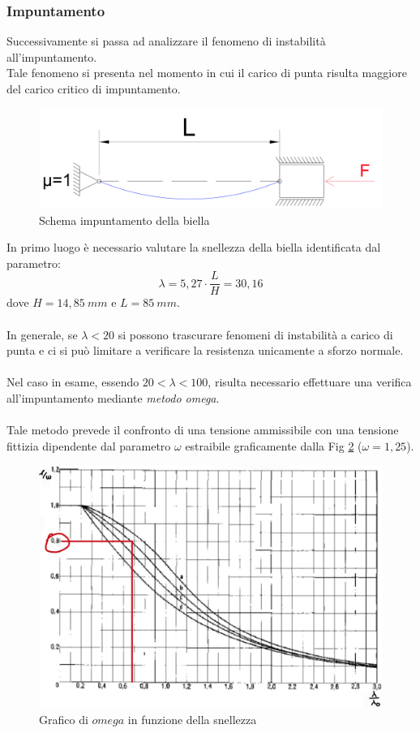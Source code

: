 \subsubsection{Impuntamento}
Successivamente si passa ad analizzare il fenomeno di instabilità all'impuntamento. \\
Tale fenomeno si presenta nel momento in cui il carico di punta risulta maggiore del carico critico di impuntamento.
\begin{figure}[h]
    \centering
    \includegraphics[scale=0.3]{Immagini/CaricoImpuntamento.png}
    \caption{Schema impuntamento della biella}
    \label{fig:CaricoImpuntamento}
\end{figure}

In primo luogo è necessario valutare la snellezza della biella identificata dal parametro:
\begin{equation}
    \lambda=5,27\cdot \frac{L}{H}=30,16
\end{equation}
dove $H=14,85\ mm$ e $L=85\ mm$.\\
\\
In generale, se $\lambda<20$ si possono trascurare fenomeni di instabilità a carico di punta e ci si può limitare a verificare la resistenza unicamente a sforzo normale.\\
\\
Nel caso in esame, essendo $20<\lambda<100$, risulta necessario effettuare una verifica all'impuntamento mediante \emph{metodo omega}.\\
\\
Tale metodo prevede il confronto di una tensione ammissibile con una tensione fittizia dipendente dal parametro $\omega$ estraibile graficamente dalla Fig \ref{fig:GraficoOmega} ($\omega=1,25$).
\newpage
\begin{figure}[h]
    \centering
    \includegraphics[scale=0.2]{Immagini/GraficoOmega.png}
    \caption{Grafico di $omega$ in funzione della snellezza}
    \label{fig:GraficoOmega}
\end{figure}

